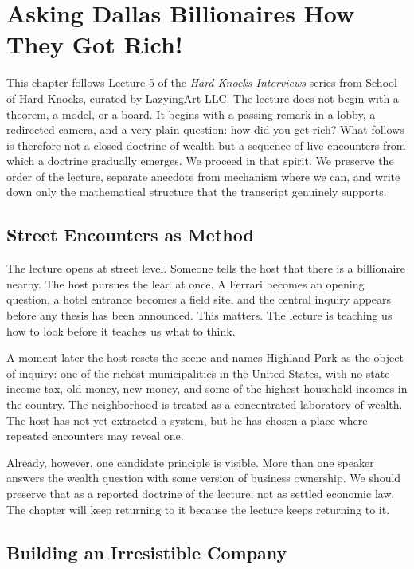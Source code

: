 \chapter{Asking Dallas Billionaires How They Got Rich!}

This chapter follows Lecture 5 of the \emph{Hard Knocks Interviews} series from School of Hard Knocks, curated by LazyingArt LLC. The lecture does not begin with a theorem, a model, or a board. It begins with a passing remark in a lobby, a redirected camera, and a very plain question: how did you get rich? What follows is therefore not a closed doctrine of wealth but a sequence of live encounters from which a doctrine gradually emerges. We proceed in that spirit. We preserve the order of the lecture, separate anecdote from mechanism where we can, and write down only the mathematical structure that the transcript genuinely supports.

\section{Street Encounters as Method}

The lecture opens at street level. Someone tells the host that there is a billionaire nearby. The host pursues the lead at once. A Ferrari becomes an opening question, a hotel entrance becomes a field site, and the central inquiry appears before any thesis has been announced. This matters. The lecture is teaching us how to look before it teaches us what to think.

A moment later the host resets the scene and names Highland Park as the object of inquiry: one of the richest municipalities in the United States, with no state income tax, old money, new money, and some of the highest household incomes in the country. The neighborhood is treated as a concentrated laboratory of wealth. The host has not yet extracted a system, but he has chosen a place where repeated encounters may reveal one.

Already, however, one candidate principle is visible. More than one speaker answers the wealth question with some version of business ownership. We should preserve that as a reported doctrine of the lecture, not as settled economic law. The chapter will keep returning to it because the lecture keeps returning to it.

\section{Building an Irresistible Company}

